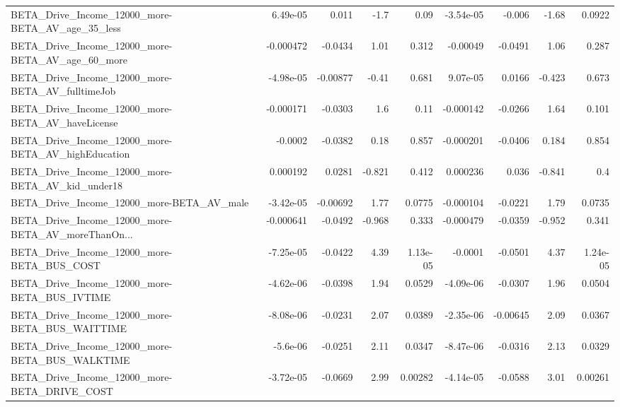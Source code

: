 \begin{tabular}{lrrrrrrrr}
BETA\_Drive\_Income\_12000\_more-BETA\_AV\_age\_35\_less   &    6.49e-05 &        0.011 &      -1.7 &     0.09 &  -3.54e-05 &      -0.006 &        -1.68 &        0.0922 \\
BETA\_Drive\_Income\_12000\_more-BETA\_AV\_age\_60\_more   &   -0.000472 &      -0.0434 &      1.01 &    0.312 &   -0.00049 &     -0.0491 &         1.06 &         0.287 \\
BETA\_Drive\_Income\_12000\_more-BETA\_AV\_fulltimeJob   &   -4.98e-05 &     -0.00877 &     -0.41 &    0.681 &   9.07e-05 &      0.0166 &       -0.423 &         0.673 \\
BETA\_Drive\_Income\_12000\_more-BETA\_AV\_haveLicense   &   -0.000171 &      -0.0303 &       1.6 &     0.11 &  -0.000142 &     -0.0266 &         1.64 &         0.101 \\
BETA\_Drive\_Income\_12000\_more-BETA\_AV\_highEducation &     -0.0002 &      -0.0382 &      0.18 &    0.857 &  -0.000201 &     -0.0406 &        0.184 &         0.854 \\
BETA\_Drive\_Income\_12000\_more-BETA\_AV\_kid\_under18   &    0.000192 &       0.0281 &    -0.821 &    0.412 &   0.000236 &       0.036 &       -0.841 &           0.4 \\
BETA\_Drive\_Income\_12000\_more-BETA\_AV\_male          &   -3.42e-05 &     -0.00692 &      1.77 &   0.0775 &  -0.000104 &     -0.0221 &         1.79 &        0.0735 \\
BETA\_Drive\_Income\_12000\_more-BETA\_AV\_moreThanOn... &   -0.000641 &      -0.0492 &    -0.968 &    0.333 &  -0.000479 &     -0.0359 &       -0.952 &         0.341 \\
BETA\_Drive\_Income\_12000\_more-BETA\_BUS\_COST         &   -7.25e-05 &      -0.0422 &      4.39 & 1.13e-05 &    -0.0001 &     -0.0501 &         4.37 &      1.24e-05 \\
BETA\_Drive\_Income\_12000\_more-BETA\_BUS\_IVTIME       &   -4.62e-06 &      -0.0398 &      1.94 &   0.0529 &  -4.09e-06 &     -0.0307 &         1.96 &        0.0504 \\
BETA\_Drive\_Income\_12000\_more-BETA\_BUS\_WAITTIME     &   -8.08e-06 &      -0.0231 &      2.07 &   0.0389 &  -2.35e-06 &    -0.00645 &         2.09 &        0.0367 \\
BETA\_Drive\_Income\_12000\_more-BETA\_BUS\_WALKTIME     &    -5.6e-06 &      -0.0251 &      2.11 &   0.0347 &  -8.47e-06 &     -0.0316 &         2.13 &        0.0329 \\
BETA\_Drive\_Income\_12000\_more-BETA\_DRIVE\_COST       &   -3.72e-05 &      -0.0669 &      2.99 &  0.00282 &  -4.14e-05 &     -0.0588 &         3.01 &       0.00261 \\

\end{tabular}
